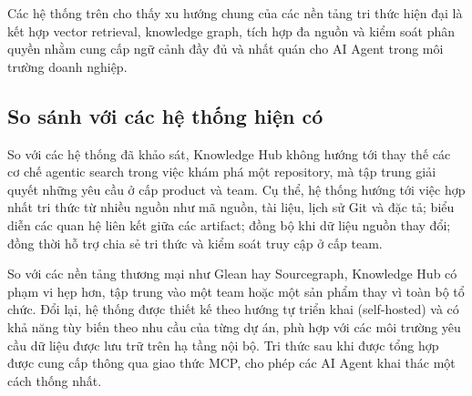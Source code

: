 Các hệ thống trên cho thấy xu hướng chung của các nền tảng tri thức hiện đại là kết hợp vector retrieval, knowledge graph, tích hợp đa nguồn và kiểm soát phân quyền nhằm cung cấp ngữ cảnh đầy đủ và nhất quán cho AI Agent trong môi trường doanh nghiệp.

\subsection{So sánh với các hệ thống hiện có}

So với các hệ thống đã khảo sát, Knowledge Hub không hướng tới thay thế các cơ chế agentic search trong việc khám phá một repository, mà tập trung giải quyết những yêu cầu ở cấp product và team. Cụ thể, hệ thống hướng tới việc hợp nhất tri thức từ nhiều nguồn như mã nguồn, tài liệu, lịch sử Git và đặc tả; biểu diễn các quan hệ liên kết giữa các artifact; đồng bộ khi dữ liệu nguồn thay đổi; đồng thời hỗ trợ chia sẻ tri thức và kiểm soát truy cập ở cấp team.

So với các nền tảng thương mại như Glean hay Sourcegraph, Knowledge Hub có phạm vi hẹp hơn, tập trung vào một team hoặc một sản phẩm thay vì toàn bộ tổ chức. Đổi lại, hệ thống được thiết kế theo hướng tự triển khai (self-hosted) và có khả năng tùy biến theo nhu cầu của từng dự án, phù hợp với các môi trường yêu cầu dữ liệu được lưu trữ trên hạ tầng nội bộ. Tri thức sau khi được tổng hợp được cung cấp thông qua giao thức MCP, cho phép các AI Agent khai thác một cách thống nhất.
